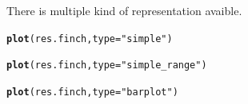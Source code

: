 \documentclass[12pt]{article}\usepackage[]{graphicx}\usepackage[]{color}
\makeatletter
\newcommand{\hlstr}[1]{\textcolor[rgb]{0.192,0.494,0.8}{#1}}%
\newcommand{\hlstd}[1]{\textcolor[rgb]{0.345,0.345,0.345}{#1}}%
\newcommand{\hlkwc}[1]{\textcolor[rgb]{0.333,0.667,0.333}{#1}}%
\newcommand{\hlkwd}[1]{\textcolor[rgb]{0.737,0.353,0.396}{\textbf{#1}}}%
\newenvironment{kframe}{%
 \def\at@end@of@kframe{}%
 \ifinner\ifhmode%
  \def\at@end@of@kframe{\end{minipage}}%
  \begin{minipage}{\columnwidth}%
 \fi\fi%
 \def\FrameCommand##1{\hskip\@totalleftmargin \hskip-\fboxsep
 \colorbox{shadecolor}{##1}\hskip-\fboxsep
     \hskip-\linewidth \hskip-\@totalleftmargin \hskip\columnwidth}%
 \MakeFramed {\advance\hsize-\width
   \@totalleftmargin\z@ \linewidth\hsize
   \@setminipage}}%
 {\par\unskip\endMakeFramed%
 \at@end@of@kframe}
\newenvironment{knitrout}{}{} %
\makeatother
\begin{document}
There is multiple kind of representation avaible.
\begin{knitrout}
\color{fgcolor}\begin{kframe}
\begin{alltt}
\hlkwd{plot}\hlstd{(res.finch,} \hlkwc{type} \hlstd{=} \hlstr{"simple"}\hlstd{)}
\end{alltt}


{\ttfamily\noindent\bfseries\color{errorcolor}{\#\# Error: objet 'res.finch' introuvable}}\begin{alltt}
\hlkwd{plot}\hlstd{(res.finch,} \hlkwc{type} \hlstd{=} \hlstr{"simple_range"}\hlstd{)}
\end{alltt}


{\ttfamily\noindent\bfseries\color{errorcolor}{\#\# Error: objet 'res.finch' introuvable}}\begin{alltt}
\hlkwd{plot}\hlstd{(res.finch,} \hlkwc{type} \hlstd{=} \hlstr{"barplot"}\hlstd{)}
\end{alltt}


{\ttfamily\noindent\bfseries\color{errorcolor}{\#\# Error: objet 'res.finch' introuvable}}\end{kframe}
\end{knitrout}
\end{document}
